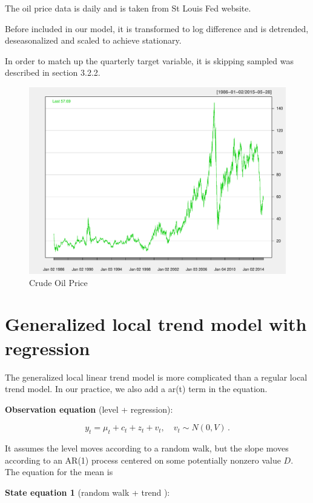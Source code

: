 The oil price data  is daily and is taken from St 
Louis Fed website.

Before included in our model, it is transformed to log difference and is detrended, deseasonalized and scaled to achieve stationary. 

In order to match up the quarterly target variable, it is skipping sampled  was described in section 3.2.2. 

\begin{figure}
	\centering
	\includegraphics[width=0.7\linewidth]{Figures/oil-report}
	\caption{Crude Oil Price}
	\label{fig:Oil Price}
\end{figure}


\label{chapter:appendixC}


\section{Generalized local trend model with regression}


The generalized local linear trend model is more complicated than a regular local trend model. In our practice, we also add a ar(t) term in the equation.



\textbf{Observation equation} (level + regression): 



$$y_t = \mu_t + c_t + z_t + v_{t}, \quad v_{t} \sim N(0, V) \, .$$



It assumes the level moves according to a random walk, but the slope moves according to an AR(1) process centered on some potentially nonzero value $D$. The equation for the mean is


\textbf{State equation 1} (random walk + trend ):  



